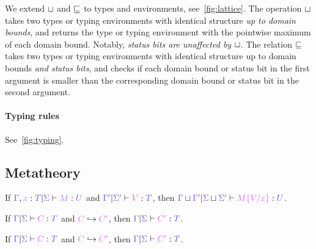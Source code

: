 \documentclass[main.tex]{subfiles}
\begin{document}
We extend $\mathbin{{\color{black}\sqcup}}$ and $\mathbin{{\color{black}\sqsubseteq}}$ to types and environments, see~\cref{fig:lattice}.
The operation $\mathbin{{\color{black}\sqcup}}$ takes two types or typing environments with identical structure \emph{up to domain bounds}, and returns the type or typing environment with the pointwise maximum of each domain bound. Notably, \emph{status bits are unaffected by $\mathbin{{\color{black}\sqcup}}$}.
The relation $\mathbin{{\color{black}\sqsubseteq}}$ takes two types or typing environments with identical structure up to domain bounds \emph{and status bits}, and checks if each domain bound or status bit in the first argument is smaller than the corresponding domain bound or status bit in the second argument.



\paragraph{Typing rules}%
\label{sec:lvar-typing}

See~\cref{fig:typing}.

\subsection{Metatheory}

\begin{lemma}[Substitution]
  \label{lem:substitution}
  If $\seq{\ty{\Gamma},\tmty{x}{T}}{\ty{\Sigma}}{M}{U}$ and $\seq{\ty{\Gamma'}}{\ty{\Sigma'}}{V}{T}$, then $\seq{\ty{\Gamma}\sqcupG\ty{\Gamma'}}{\ty{\Sigma}\sqcupG\ty{\Sigma'}}{\subst{M}{V}{x}}{U}$.
\end{lemma}
\begin{lemma}
  \label{lem:subject-reduction}
  If $\seq{\ty{\Gamma}}{\ty{\Sigma}}{C}{T}$ and $\tm{C}\redc\tm{C'}$, then $\seq{\ty{\Gamma}}{\ty{\Sigma}}{C'}{T}$.
\end{lemma}
% 

\begin{theorem}
  \label{thm:subject-reduction}
  If $\seq{\ty{\Gamma}}{\ty{\Sigma}}{C}{T}$ and $\tm{C}\redc\tm{C'}$, then $\seq{\ty{\Gamma}}{\ty{\Sigma}}{C'}{T}$.
\end{theorem}
\end{document}
